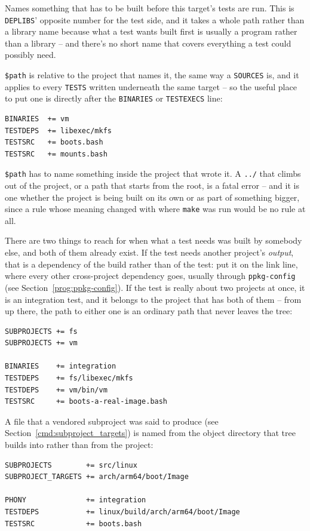 \documentclass{article}
\begin{document}
Names something that has to be built before this target's tests are
run.  This is \texttt{DEPLIBS}' opposite number for the test side, and
it takes a whole path rather than a library name because what a test
wants built first is usually a program rather than a library -- and
there's no short name that covers everything a test could possibly
need.

\texttt{\$path} is relative to the project that names it, the same way
a \texttt{SOURCES} is, and it applies to every \texttt{TESTS} written
underneath the same target -- so the useful place to put one is
directly after the \texttt{BINARIES} or \texttt{TESTEXECS} line:

\begin{verbatim}
BINARIES  += vm
TESTDEPS  += libexec/mkfs
TESTSRC   += boots.bash
TESTSRC   += mounts.bash
\end{verbatim}

\texttt{\$path} has to name something inside the project that wrote
it.  A \texttt{../} that climbs out of the project, or a path that
starts from the root, is a fatal error -- and it is one whether the
project is being built on its own or as part of something bigger,
since a rule whose meaning changed with where \texttt{make} was run
would be no rule at all.

There are two things to reach for when what a test needs was built by
somebody else, and both of them already exist.  If the test needs
another project's \textit{output}, that is a dependency of the build
rather than of the test: put it on the link line, where every other
cross-project dependency goes, usually through \texttt{ppkg-config}
(see Section~\ref{prog:ppkg-config}).  If the test is really about two
projects at once, it is an integration test, and it belongs to the
project that has both of them -- from up there, the path to either
one is an ordinary path that never leaves the tree:

\begin{verbatim}
SUBPROJECTS += fs
SUBPROJECTS += vm

BINARIES    += integration
TESTDEPS    += fs/libexec/mkfs
TESTDEPS    += vm/bin/vm
TESTSRC     += boots-a-real-image.bash
\end{verbatim}

A file that a vendored subproject was said to produce (see
Section~\ref{cmd:subproject_targets}) is named from the object
directory that tree builds into rather than from the project:

\begin{verbatim}
SUBPROJECTS        += src/linux
SUBPROJECT_TARGETS += arch/arm64/boot/Image

PHONY              += integration
TESTDEPS           += linux/build/arch/arm64/boot/Image
TESTSRC            += boots.bash
\end{verbatim}
\end{document}
